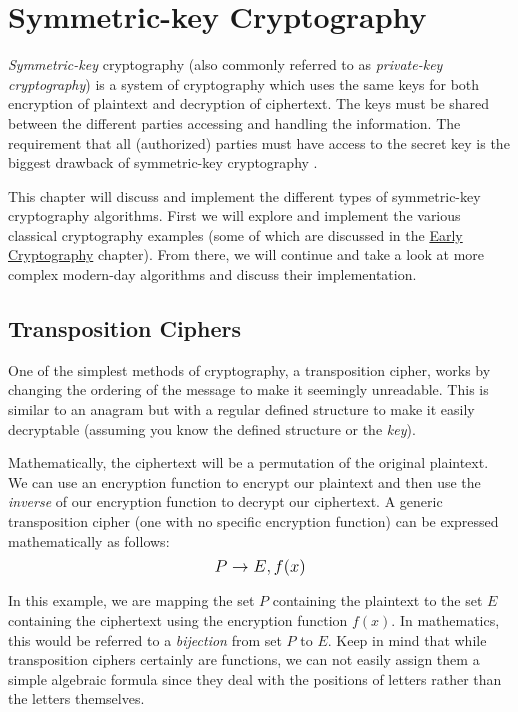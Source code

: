 \chapter{Symmetric-key Cryptography} %
\label{Symmetric-key Cryptography} %

\textit{Symmetric-key} cryptography (also commonly referred to as \textit{private-key cryptography}) is a system of cryptography which
uses the same keys for both encryption of plaintext and decryption of ciphertext. The keys must be shared between the different
parties accessing and handling the information. The requirement that all (authorized) parties must have access to the secret key
is the biggest drawback of symmetric-key cryptography \cite{wiki:symmetric_key_cryptography}.     

This chapter will discuss and implement the different types of symmetric-key cryptography algorithms. 
First we will explore and implement the various classical cryptography examples (some of which are discussed in the 
\hyperref[Early Cryptography]{Early Cryptography} chapter). From there, we will continue and take a look at more complex modern-day algorithms 
and discuss their implementation. 

\section{Transposition Ciphers}

One of the simplest methods of cryptography, a transposition cipher, works by changing the ordering of the message to make it seemingly unreadable.
This is similar to an anagram but with a regular defined structure to make it easily decryptable (assuming you know the defined structure or the \textit{key}).   

Mathematically, the ciphertext will be a permutation of the original plaintext. We can use an encryption function to encrypt our plaintext and then use 
the \textit{inverse} of our encryption function to decrypt our ciphertext. A generic transposition cipher (one with no specific encryption function) 
can be expressed mathematically as follows: $$\mathlarger{P \rightarrow E, f(x)}$$

In this example, we are mapping the set $P$ containing the plaintext to the set $E$ containing the ciphertext using the encryption function $f(x)$. 
In mathematics, this would be referred to a \textit{bijection} from set $P$ to $E$. Keep in mind that while transposition ciphers certainly
are functions, we can not easily assign them a simple algebraic formula since they deal with the positions of letters rather than the letters themselves.

